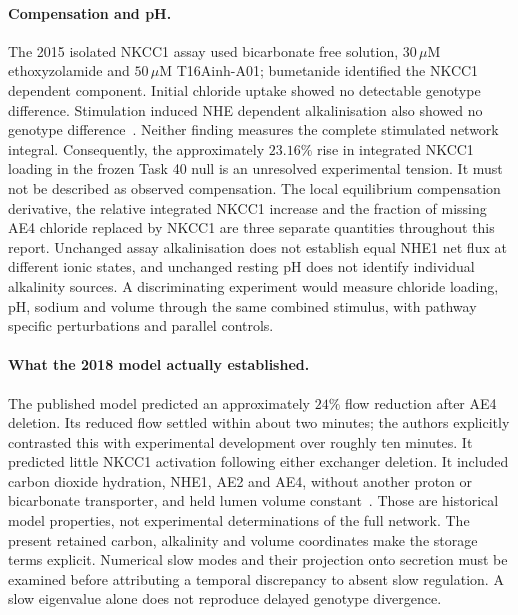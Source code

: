 \paragraph{Compensation and pH.}
The 2015 isolated NKCC1 assay used bicarbonate free solution,
$30\,\mu\mathrm{M}$ ethoxyzolamide and
$50\,\mu\mathrm{M}$ T16Ainh-A01; bumetanide identified the
NKCC1 dependent component. Initial chloride uptake showed no detectable
genotype difference. Stimulation induced NHE dependent alkalinisation
also showed no genotype difference~\cite{Pena2015}.
Neither finding measures the complete stimulated network integral.
Consequently, the approximately $23.16\%$ rise in integrated NKCC1
loading in the frozen Task 40 null is an unresolved experimental
tension. It must not be described as observed compensation. The local
equilibrium compensation derivative, the relative integrated NKCC1
increase and the fraction of missing AE4 chloride replaced by NKCC1
are three separate quantities throughout this report. Unchanged assay
alkalinisation does not establish equal NHE1 net flux at different ionic
states, and unchanged resting pH does not identify individual alkalinity
sources. A discriminating experiment would measure chloride loading,
pH, sodium and volume through the same combined stimulus, with
pathway specific perturbations and parallel controls.

\paragraph{What the 2018 model actually established.}
The published model predicted an approximately $24\%$ flow reduction
after AE4 deletion. Its reduced flow settled within about two minutes;
the authors explicitly contrasted this with experimental development
over roughly ten minutes. It predicted little NKCC1 activation following
either exchanger deletion. It included carbon dioxide hydration, NHE1,
AE2 and AE4, without another proton or bicarbonate transporter, and
held lumen volume constant~\cite{VeraSiguenza2018}.
Those are historical model properties, not experimental determinations
of the full network. The present retained carbon, alkalinity and volume
coordinates make the storage terms explicit. Numerical slow modes and
their projection onto secretion must be examined before attributing a
temporal discrepancy to absent slow regulation. A slow eigenvalue alone
does not reproduce delayed genotype divergence.

